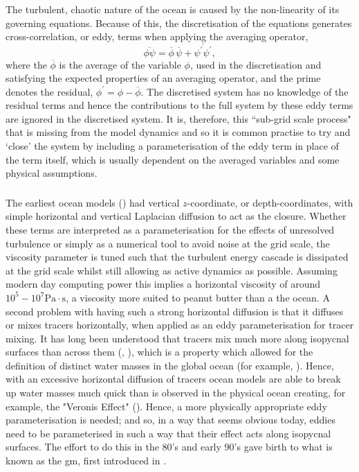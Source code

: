 \documentclass[10pt,a4paper]{article}
\newcommand*\mean[1]{\overline{#1}}
\newcommand*\res[1]{{#1}^{\prime}}
\begin{document}
 The turbulent, chaotic nature of the ocean is caused by the non-linearity of its 
 governing equations. Because of this,  the discretisation of the equations generates cross-correlation, or eddy, terms when applying the 
 averaging operator,
 \begin{equation}
 \mean{\phi\psi} = \mean{\phi}\,\mean{\psi} + 
 \mean{\res{\psi}\res{\psi}},
 \label{non-lin average}
 \end{equation}
 where the ${\mean{\phi}}$ is the average of the variable ${\phi}$, used in
 the discretisation and satisfying
 the expected properties of an averaging operator, and the prime denotes the residual, ${\phi^{\prime} = \phi - \mean{\phi}}$.
 The discretised system has no knowledge of the residual terms and hence
 the contributions to the full system by these eddy terms are
 ignored in the discretised system. It is, therefore, this ``sub-grid scale process"
 that is missing from the model dynamics and so it is common practise to try and
 `close' the system by including a parameterisation of the eddy
 term in place of the term itself, which is usually dependent on the averaged 
 variables and some physical assumptions.
 
 \subsubsection{\cite{gent1990}}
 
 The earliest ocean models (\cite{bryan1969numerical}) had vertical $z$-coordinate, or depth-coordinates, with simple horizontal and vertical Laplacian diffusion to act as 
 the closure. Whether these terms are interpreted as a parameterisation for the effects
 of unresolved turbulence or simply as a numerical tool to avoid noise at 
 the grid scale, the viscosity parameter is tuned such that the turbulent energy cascade is 
 dissipated at the grid scale whilst still allowing as active dynamics as possible. 
 Assuming modern day computing power this implies a horizontal viscosity of around 
 $10^{5} - 10^{7} \mathrm{Pa} \cdot \mathrm{s}$, a viscosity more suited to peanut butter than 
 a the ocean. A second problem with having such a strong horizontal diffusion is
 that it diffuses or mixes tracers horizontally, when applied as
 an eddy parameterisation for tracer mixing. It has long been understood that tracers 
 mix much more along isopycnal surfaces than across them (\cite{iselin1939influence}, \cite{montgomery1940present}), which is a property which allowed for the definition of
 distinct water masses in the global ocean (for example, \cite{emery1986global}).
  Hence, with an excessive horizontal diffusion
 of tracers ocean models are able to break up water masses much quick than
 is observed in the physical ocean creating, for example, the "Veronis Effect" (\cite{veronis1975role}).
 Hence, a more physically appropriate eddy parameterisation 
 is needed;
  and so, in a way that seems obvious today, eddies need to be
   parameterised in 
 such a way that their effect acts along isopycnal surfaces. 
 The effort to do this in the 80's and early 90's gave birth
 to what is known as the \gls{gm}, first introduced in \cite{gent1990}.
 
\end{document}
